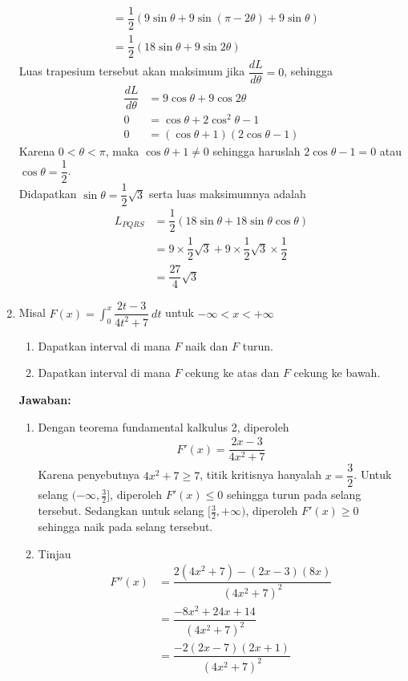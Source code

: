 \documentclass{article}
\begin{document}
\begin{enumerate}
\begin{align*}
	&= \dfrac{1}{2}\left(9\sin\theta+9\sin(\pi-2\theta)+9\sin \theta\right)\\
	&= \dfrac{1}{2}\left(18\sin\theta+9\sin 2\theta\right)
	\end{align*}
	Luas trapesium tersebut akan maksimum jika $\dfrac{dL}{d\theta} = 0$, sehingga
	\begin{align*}
	\dfrac{dL}{d\theta} &= 9\cos\theta +9\cos 2\theta \\
	0 &= \cos\theta + 2\cos^2\theta -1 \\
	0 &= (\cos \theta +1)(2\cos\theta-1)
	\end{align*}
	Karena $0<\theta<\pi$, maka $\cos\theta+1\neq 0$ sehingga haruslah $2\cos\theta-1=0$ atau $\cos\theta=\dfrac{1}{2}$.\\
	Didapatkan $\sin\theta=\dfrac{1}{2}\sqrt{3}$ serta luas maksimumnya adalah 
	\begin{align*}
	L_{PQRS} &= \dfrac{1}{2}(18\sin \theta+18\sin\theta\cos\theta)\\
	&= 9\times\dfrac{1}{2}\sqrt{3}+9\times\dfrac{1}{2}\sqrt{3}\times\dfrac{1}{2}\\
	&= \dfrac{27}{4}\sqrt{3}
	\end{align*}
	\item Misal $F(x)=\displaystyle \int_0^x \dfrac{2t-3}{4t^2+7}~ dt$ untuk $-\infty <x<+\infty$
	\begin{enumerate}
		\item Dapatkan interval di mana $F$ naik dan $F$ turun.
		\item Dapatkan interval di mana $F$ cekung ke atas dan $F$ cekung ke bawah.
	\end{enumerate}
	\textbf{Jawaban:}
	\begin{enumerate}
		\item Dengan teorema fundamental kalkulus 2, diperoleh 
		\begin{align*}
		F'(x) = \dfrac{2x-3}{4x^2+7}
		\end{align*}
		Karena penyebutnya $4x^2+7\geq 7$, titik kritisnya hanyalah $x=\dfrac{3}{2}$. Untuk selang $(-\infty,\frac{3}{2}]$, diperoleh $F'(x)\leq 0$ sehingga turun pada selang tersebut. Sedangkan untuk selang $[\frac{3}{2},+\infty)$, diperoleh $F'(x)\geq 0$ sehingga naik pada selang tersebut.
		\item Tinjau 
		\begin{align*}
		F''(x) &= \dfrac{2(4x^2+7)-(2x-3)(8x)}{(4x^2+7)^2}\\
		&= \dfrac{-8x^2+24x+14}{(4x^2+7)^2}\\
		&= \dfrac{-2(2x-7)(2x+1)}{(4x^2+7)^2}

\end{align*}
\end{enumerate}
\end{enumerate}
\end{document}
